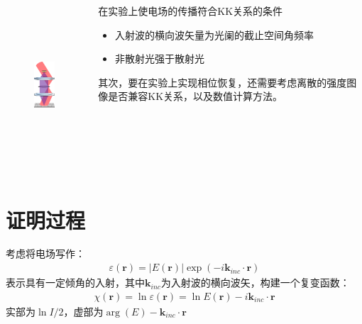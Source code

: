\documentclass[12pt,aspectratio=169]{beamer} %
\renewcommand{\vec}[1]{\boldsymbol{#1}} %
\begin{document}
\begin{frame}
    \begin{columns}
        \begin{column}{0.3\textwidth}
            \begin{figure}
                \includegraphics[height=6cm]{images/1.png}
            \end{figure}
        \end{column}
        \begin{column}{0.6\textwidth}
            \begin{block}{在实验上使电场的传播符合KK关系的条件}
                \begin{itemize}
                    \item 入射波的横向波矢量为光阑的截止空间角频率
                    \item 非散射光强于散射光
                \end{itemize}
            \end{block}
            
            \qquad 其次，要在实验上实现相位恢复，还需要考虑离散的强度图像是否兼容KK关系，以及数值计算方法。
        \end{column}
    \end{columns}
\end{frame}

\section{证明过程}
\begin{frame}
    考虑将电场写作：
    \begin{align}
        \varepsilon(\vec{r})=\left| E(\vec{r}) \right| \exp(-i\vec{k}_{inc}\cdot \vec{r}) \label{A}
    \end{align}
    表示具有一定倾角的入射，其中$\vec{k}_{inc}$为入射波的横向波矢，构建一个复变函数：
    \begin{align}
        \chi (\vec{r})=\ln \varepsilon(\vec{r})=\ln E(\vec{r})-i\vec{k}_{inc}\cdot \vec{r}
    \end{align}
    实部为$\ln I /2$，虚部为$\arg(E)-\vec{k}_{inc}\cdot \vec{r}$ \label{C}
\end{frame}
\end{document}
